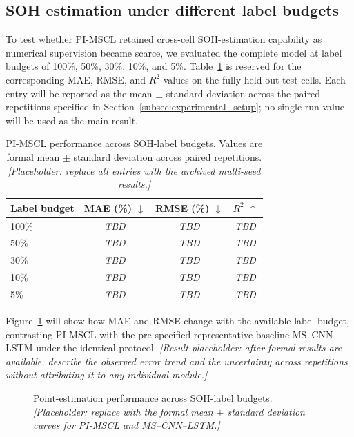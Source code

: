 \subsection{SOH estimation under different label budgets}
\label{subsec:main_results}

To test whether PI-MSCL retained cross-cell SOH-estimation capability as numerical supervision became scarce, we evaluated the complete model at label budgets of 100\%, 50\%, 30\%, 10\%, and 5\%. Table~\ref{tab:pi_mscl_label_budget} is reserved for the corresponding MAE, RMSE, and $R^2$ values on the fully held-out test cells. Each entry will be reported as the mean $\pm$ standard deviation across the paired repetitions specified in Section~\ref{subsec:experimental_setup}; no single-run value will be used as the main result.

\begin{table}[t]
\caption{PI-MSCL performance across SOH-label budgets. Values are formal mean $\pm$ standard deviation across paired repetitions. \textit{[Placeholder: replace all entries with the archived multi-seed results.]}}
\label{tab:pi_mscl_label_budget}
\centering
\small
\begin{tabular*}{\textwidth}{@{\extracolsep{\fill}}lccc@{}}
\toprule
Label budget & MAE (\%) $\downarrow$ & RMSE (\%) $\downarrow$ & $R^2$ $\uparrow$ \\
\midrule
100\% & \textit{TBD} & \textit{TBD} & \textit{TBD} \\
50\%  & \textit{TBD} & \textit{TBD} & \textit{TBD} \\
30\%  & \textit{TBD} & \textit{TBD} & \textit{TBD} \\
10\%  & \textit{TBD} & \textit{TBD} & \textit{TBD} \\
5\%   & \textit{TBD} & \textit{TBD} & \textit{TBD} \\
\bottomrule
\end{tabular*}
\end{table}

Figure~\ref{fig:label_budget_trends} will show how MAE and RMSE change with the available label budget, contrasting PI-MSCL with the pre-specified representative baseline MS--CNN--LSTM under the identical protocol. \textit{[Result placeholder: after formal results are available, describe the observed error trend and the uncertainty across repetitions without attributing it to any individual module.]}

\begin{figure}[t]
\centering
{}
\caption{Point-estimation performance across SOH-label budgets. \textit{[Placeholder: replace with the formal mean $\pm$ standard deviation curves for PI-MSCL and MS--CNN--LSTM.]}}
\label{fig:label_budget_trends}
\end{figure}

